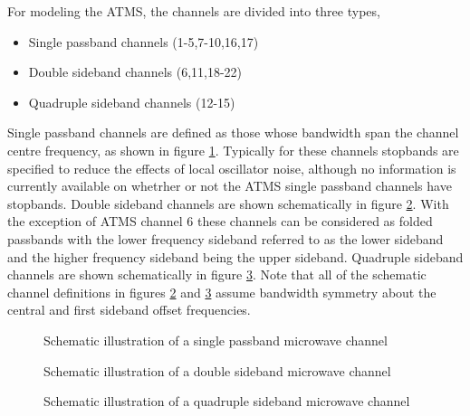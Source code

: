 For modeling the ATMS, the channels are divided into three types,
\begin{itemize}
  \item{Single passband channels (1-5,7-10,16,17)}
  \item{Double sideband channels (6,11,18-22)}
  \item{Quadruple sideband channels (12-15)}
\end{itemize}
Single passband channels are defined as those whose bandwidth span the channel centre frequency, as shown in figure \ref{fig:single_passband}. Typically for these channels stopbands are specified to reduce the effects of local oscillator noise, although no information is currently available on whetrher or not the ATMS single passband channels have stopbands. Double sideband channels are shown schematically in figure \ref{fig:double_sideband}. With the exception of ATMS channel 6 these channels can be considered as folded passbands with the lower frequency sideband referred to as the lower sideband and the higher frequency sideband being the upper sideband. Quadruple sideband channels are shown schematically in figure \ref{fig:quadruple_sideband}. Note that all of the schematic channel definitions in figures \ref{fig:double_sideband} and \ref{fig:quadruple_sideband} assume bandwidth symmetry about the central and first sideband offset frequencies.
\begin{figure}[htp]
  \centering
  
  \caption{Schematic illustration of a single passband microwave channel}
  \label{fig:single_passband}
\end{figure}
\begin{figure}[htp]
  \centering
  
  \caption{Schematic illustration of a double sideband microwave channel}
  \label{fig:double_sideband}
\end{figure}
\begin{figure}[htp]
  \centering
  
  \caption{Schematic illustration of a quadruple sideband microwave channel}
  \label{fig:quadruple_sideband}
\end{figure}

